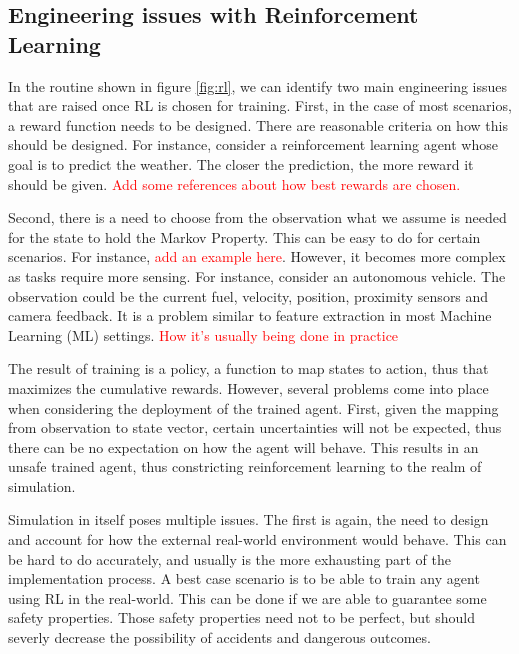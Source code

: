 \documentclass[a4paper,11pt]{article}
\begin{document}
\subsection{Engineering issues with Reinforcement Learning}

In the routine shown in figure \ref{fig:rl}, we can identify two main engineering issues that are raised once RL is chosen for training. First, in the case of most scenarios, 
a reward function needs to be designed. There are reasonable criteria on how this should be designed. For instance, consider a reinforcement learning agent whose goal is to predict the weather. 
The closer the prediction, the more reward it should be given. \textcolor{red}{Add some references about how best rewards are chosen.}

\medskip

Second, there is a need to choose from the observation what we assume is needed for the state to hold the Markov Property. This can be easy to do for certain scenarios. 
For instance, \textcolor{red}{add an example here}. However, it becomes more complex as tasks require more sensing. For instance, consider an autonomous vehicle. The observation could be 
the current fuel, velocity, position, proximity sensors and camera feedback. It is a problem similar to feature extraction in most Machine Learning (ML) settings. \textcolor{red}{How it's usually being done in practice}


\medskip

The result of training is a policy, a function to map states to action, thus that maximizes the cumulative rewards. 
However, several problems come into place when considering the deployment of the trained agent. First, given the mapping from observation to state vector, 
certain uncertainties will not be expected, thus there can be no expectation on how the agent will behave. 
This results in an unsafe trained agent, thus constricting reinforcement learning to the realm of simulation. 

\medskip 

Simulation in itself poses multiple issues. The first is again, the need to design and account for how the external real-world environment would behave. 
This can be hard to do accurately, and usually is the more exhausting part of the implementation process. A best case scenario is to be able to train any agent using RL in the 
real-world. This can be done if we are able to guarantee some safety properties. Those safety properties need not to be perfect, but should severly decrease the possibility of accidents 
and dangerous outcomes. 
\end{document}
